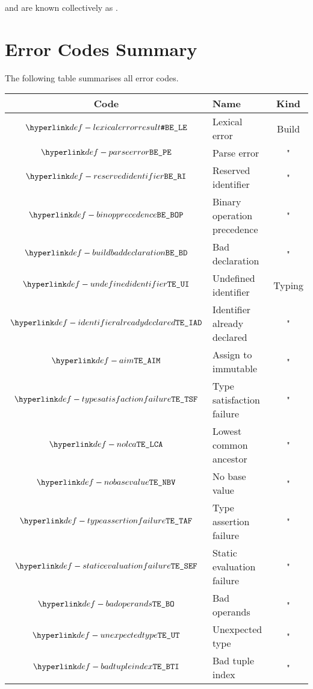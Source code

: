 \Builderrorsterm{} and \typingerrorsterm{} are known collectively as \staticerrorsterm.

\section{Error Codes Summary\label{sec:ErrorCodesSummary}}
The following table summarises all error codes.

\begin{center}
\begin{tabular}{clc}
\hline
\textbf{Code} & \textbf{Name} & \textbf{Kind} \\
\hline
  $\LexicalError$                & Lexical error                  & Build         \\
  $\ParseError$                  & Parse error                    & "             \\
  $\ReservedIdentifier$          & Reserved identifier            & "             \\
  $\BinopPrecedence$             & Binary operation precedence    & "             \\
  $\BuildBadDeclaration$         & Bad declaration                & "             \\
  \hline
  $\UndefinedIdentifier$         & Undefined identifier           & Typing        \\
  $\IdentifierAlreadyDeclared$   & Identifier already declared    & "             \\
  $\AssignmentToImmutable$       & Assign to immutable            & "             \\
  $\TypeSatisfactionFailure$     & Type satisfaction failure      & "             \\
  $\NoLCA$                       & Lowest common ancestor         & "             \\
  $\NoBaseValue$                 & No base value                  & "             \\
  $\TypeAssertionFailure$        & Type assertion failure         & "             \\
  $\StaticEvaluationFailure$     & Static evaluation failure      & "             \\
  $\BadOperands$                 & Bad operands                   & "             \\
  $\UnexpectedType$              & Unexpected type                & "             \\
  $\BadTupleIndex$               & Bad tuple index                & "             \\

\end{tabular}
\end{center}

